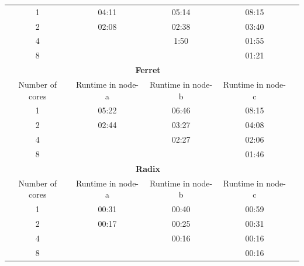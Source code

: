 \begin{enumerate}
\begin{itemize}
\begin{table}[!htp]
\begin{tabular}{ccccc}
            \midrule
            1 &04:11 &05:14 &08:15 \\
            2 &02:08 &02:38 &03:40 \\
            4 & &1:50 &01:55 \\
            8 & & &01:21 \\
            \toprule
            \multicolumn{4}{c}{\textbf{Ferret}} \\
            \midrule
            Number of cores &Runtime in node-a &Runtime in node-b &Runtime in node-c \\
            \midrule
            1 &05:22 &06:46 &08:15 \\
            2 &02:44 &03:27 &04:08 \\
            4 & &02:27 &02:06 \\
            8 & & &01:46 \\
            \toprule
            \multicolumn{4}{c}{\textbf{Radix}} \\
            \midrule
            Number of cores &Runtime in node-a &Runtime in node-b &Runtime in node-c \\
            \midrule
            1 &00:31 &00:40 &00:59 \\
            2 &00:17 &00:25 &00:31 \\
            4 & &00:16 &00:16 \\
            8 & & &00:16 \\
            \bottomrule
            \end{tabular}
            \end{table}
        
    \end{itemize}
\end{enumerate}

\newpage
